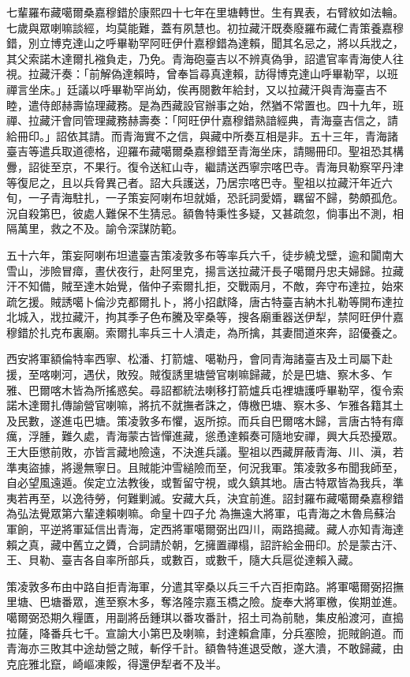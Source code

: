 \begin{pinyinscope}
七輩羅布藏噶爾桑嘉穆錯於康熙四十七年在里塘轉世。生有異表，右臂紋如法輪。七歲與眾喇嘛談經，均莫能難，蓋有夙慧也。初拉藏汗既奏廢羅布藏仁青策養嘉穆錯，別立博克達山之呼畢勒罕阿旺伊什嘉穆錯為達賴，聞其名忌之，將以兵戕之，其父索諾木達爾扎襁負走，乃免。青海砲臺吉以不辨真偽爭，詔遣官率青海使人往視。拉藏汗奏：「前解偽達賴時，曾奉旨尋真達賴，訪得博克達山呼畢勒罕，以班禪言坐床。」廷議以呼畢勒罕尚幼，俟再閱數年給封，又以拉藏汗與青海臺吉不睦，遣侍郎赫壽協理藏務。是為西藏設官辦事之始，然猶不常置也。四十九年，班禪、拉藏汗會同管理藏務赫壽奏：「阿旺伊什嘉穆錯熟諳經典，青海臺吉信之，請給冊印。」詔依其請。而青海實不之信，與藏中所奏互相是非。五十三年，青海諸臺吉等遣兵取道德格，迎羅布藏噶爾桑嘉穆錯至青海坐床，請賜冊印。聖祖恐其構釁，詔徙至京，不果行。復令送紅山寺，繼請送西寧宗喀巴寺。青海貝勒察罕丹津等復尼之，且以兵脅異己者。詔大兵護送，乃居宗喀巴寺。聖祖以拉藏汗年近六旬，一子青海駐扎，一子策妄阿喇布坦就婚，恐託詞愛婿，羈留不歸，勢頗孤危。況自殺第巴，彼處人難保不生猜忌。額魯特秉性多疑，又甚疏忽，倘事出不測，相隔萬里，救之不及。諭令深謀防範。

五十六年，策妄阿喇布坦遣臺吉策凌敦多布等率兵六千，徒步繞戈壁，逾和闐南大雪山，涉險冒瘴，晝伏夜行，赴阿里克，揚言送拉藏汗長子噶爾丹忠夫婦歸。拉藏汗不知備，賊至達木始覺，偕仲子索爾扎拒，交戰兩月，不敵，奔守布達拉，始來疏乞援。賊誘噶卜倫沙克都爾扎卜，將小招獻降，唐古特臺吉納木扎勒等開布達拉北城入，戕拉藏汗，拘其季子色布騰及宰桑等，搜各廟重器送伊犁，禁阿旺伊什嘉穆錯於扎克布裏廟。索爾扎率兵三十人潰走，為所擒，其妻間道來奔，詔優養之。

西安將軍額倫特率西寧、松潘、打箭爐、噶勒丹，會同青海諸臺吉及土司屬下赴援，至喀喇河，遇伏，敗歿。賊復誘里塘營官喇嘛歸藏，於是巴塘、察木多、乍雅、巴爾喀木皆為所搖惑矣。尋詔都統法喇移打箭爐兵屯裡塘護呼畢勒罕，復令索諾木達爾扎傳諭營官喇嘛，將抗不就撫者誅之，傳檄巴塘、察木多、乍雅各籍其土及民數，遂進屯巴塘。策凌敦多布懼，返所掠。而兵自巴爾喀木歸，言唐古特有瘴癘，浮腫，難久處，青海蒙古皆憚進藏，慫恿達賴奏可隨地安禪，興大兵恐擾眾。王大臣懲前敗，亦皆言藏地險遠，不決進兵議。聖祖以西藏屏蔽青海、川、滇，若準夷盜據，將邊無寧日。且賊能沖雪縋險而至，何況我軍。策凌敦多布聞我師至，自必望風遠遁。俟定立法教後，或暫留守視，或久鎮其地。唐古特眾皆為我兵，準夷若再至，以逸待勞，何難剿滅。安藏大兵，決宜前進。詔封羅布藏噶爾桑嘉穆錯為弘法覺眾第六輩達賴喇嘛。命皇十四子允為撫遠大將軍，屯青海之木魯烏蘇治軍餉，平逆將軍延信出青海，定西將軍噶爾弼出四川，兩路搗藏。藏人亦知青海達賴之真，藏中舊立之贗，合詞請於朝，乞擁置禪榻，詔許給金冊印。於是蒙古汗、王、貝勒、臺吉各自率所部兵，或數百，或數千，隨大兵扈從達賴入藏。

策凌敦多布由中路自拒青海軍，分遣其宰桑以兵三千六百拒南路。將軍噶爾弼招撫里塘、巴塘番眾，進至察木多，奪洛隆宗嘉玉橋之險。旋奉大將軍檄，俟期並進。噶爾弼恐期久糧匱，用副將岳鍾琪以番攻番計，招土司為前馳，集皮船渡河，直搗拉薩，降番兵七千。宣諭大小第巴及喇嘛，封達賴倉庫，分兵塞險，扼賊餉道。而青海亦三敗其中途劫營之賊，斬俘千計。額魯特進退受敵，遂大潰，不敢歸藏，由克庇雅北竄，崎嶇凍餒，得還伊犁者不及半。


\end{pinyinscope}
